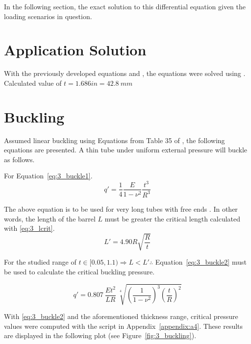 In the following section, the exact solution to this differential equation given the loading scenarios in question.


\section{Application Solution}
\label{section:3_roark}

With the previously developed equations and \cite{roarks}, the equations were solved using \cite{EXCEL}.\\

Calculated value of $t=1.686 in  = 42.8\ mm$

\section{Buckling}
\label{section:3_buckle}

Assumed linear buckling using Equations from Table 35 of \cite{roarks}, the following equations are presented. A thin tube under uniform external pressure will buckle as follows.

For Equation~\ref{eq:3_buckle1}.
\begin{equation}
	\label{eq:3_buckle1}
	q' =\frac{1}{4} \frac{E}{1-\nu^2} \frac{t^3}{R^3}
\end{equation}

The above equation is to be used for very long tubes with free ends \cite{roarks}. In other words, the length of the barrel $L$ must be greater the critical length calculated with \ref{eq:3_lcrit}.
\begin{equation}
	\label{eq:3_lcrit}
	L' = 4.90 R \sqrt{\frac{R}{t}}
\end{equation}

For the studied range of $t \in [0.05, 1.1) \Rightarrow L < L' \therefore$ Equation~\ref{eq:3_buckle2} must be used to calculate the critical buckling pressure.

\begin{equation}
	\label{eq:3_buckle2}
	q' =0.807\  \frac{Et^2}{LR}\  \sqrt[4]{\left( \frac{1}{1-\nu^2} \right)^3 \left( \frac{t}{R}\right)^2}
\end{equation}

With \ref{eq:3_buckle2} and the aforementioned thickness range, critical pressure values were computed with the \cite{PYTHON} script in Appendix~\ref{appendix:a4}. These results are displayed in the following plot (see Figure~\ref{fig:3_buckling}).

